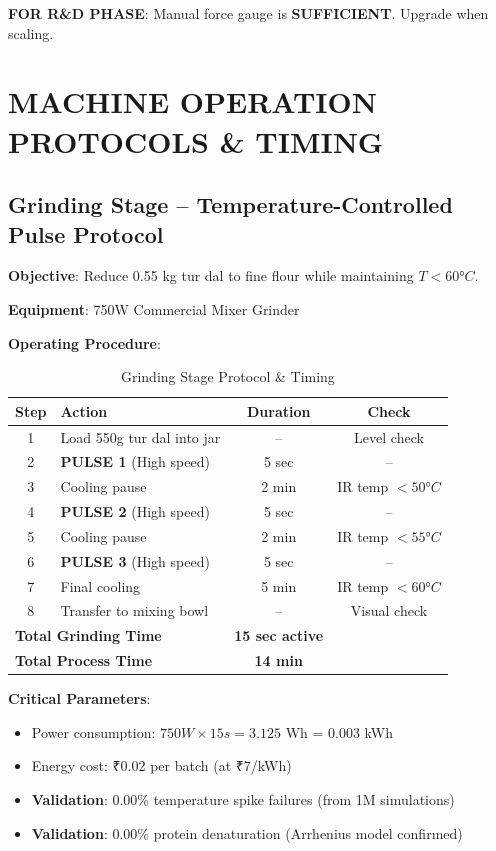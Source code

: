 \documentclass[12pt,a4paper]{article}
\begin{document}
\textbf{FOR R\&D PHASE}: Manual force gauge is \textbf{SUFFICIENT}. Upgrade when scaling.

\newpage

\section{MACHINE OPERATION PROTOCOLS \& TIMING}

\subsection{Grinding Stage -- Temperature-Controlled Pulse Protocol}

\textbf{Objective}: Reduce 0.55 kg tur dal to fine flour while maintaining $T < 60°C$.

\textbf{Equipment}: 750W Commercial Mixer Grinder

\textbf{Operating Procedure}:

\begin{table}[h]
\centering
\begin{tabular}{clcc}
\toprule
\textbf{Step} & \textbf{Action} & \textbf{Duration} & \textbf{Check} \\
\midrule
1 & Load 550g tur dal into jar & -- & Level check \\
2 & \textbf{PULSE 1} (High speed) & 5 sec & -- \\
3 & Cooling pause & 2 min & IR temp $< 50°C$ \\
4 & \textbf{PULSE 2} (High speed) & 5 sec & -- \\
5 & Cooling pause & 2 min & IR temp $< 55°C$ \\
6 & \textbf{PULSE 3} (High speed) & 5 sec & -- \\
7 & Final cooling & 5 min & IR temp $< 60°C$ \\
8 & Transfer to mixing bowl & -- & Visual check \\
\midrule
\multicolumn{2}{l}{\textbf{Total Grinding Time}} & \textbf{15 sec active} & \\
\multicolumn{2}{l}{\textbf{Total Process Time}} & \textbf{14 min} & \\
\bottomrule
\end{tabular}
\caption{Grinding Stage Protocol \& Timing}
\end{table}

\textbf{Critical Parameters}:
\begin{itemize}
    \item Power consumption: $750W \times 15s = 3.125$ Wh = $0.003$ kWh
    \item Energy cost: ₹0.02 per batch (at ₹7/kWh)
    \item \textbf{Validation}: 0.00\% temperature spike failures (from 1M simulations)
    \item \textbf{Validation}: 0.00\% protein denaturation (Arrhenius model confirmed)
\end{itemize}
\end{document}
